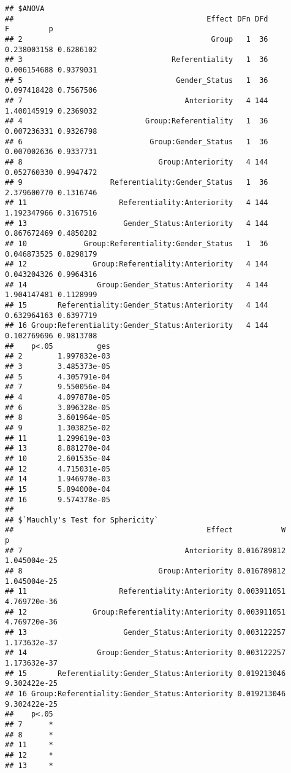 \documentclass[
]{article}
\begin{document}
\begin{verbatim}
## $ANOVA
##                                            Effect DFn DFd           F         p
## 2                                           Group   1  36 0.238003158 0.6286102
## 3                                  Referentiality   1  36 0.006154688 0.9379031
## 5                                   Gender_Status   1  36 0.097418428 0.7567506
## 7                                     Anteriority   4 144 1.400145919 0.2369032
## 4                            Group:Referentiality   1  36 0.007236331 0.9326798
## 6                             Group:Gender_Status   1  36 0.007002636 0.9337731
## 8                               Group:Anteriority   4 144 0.052760330 0.9947472
## 9                    Referentiality:Gender_Status   1  36 2.379600770 0.1316746
## 11                     Referentiality:Anteriority   4 144 1.192347966 0.3167516
## 13                      Gender_Status:Anteriority   4 144 0.867672469 0.4850282
## 10             Group:Referentiality:Gender_Status   1  36 0.046873525 0.8298179
## 12               Group:Referentiality:Anteriority   4 144 0.043204326 0.9964316
## 14                Group:Gender_Status:Anteriority   4 144 1.904147481 0.1128999
## 15       Referentiality:Gender_Status:Anteriority   4 144 0.632964163 0.6397719
## 16 Group:Referentiality:Gender_Status:Anteriority   4 144 0.102769696 0.9813708
##    p<.05          ges
## 2        1.997832e-03
## 3        3.485373e-05
## 5        4.305791e-04
## 7        9.550056e-04
## 4        4.097878e-05
## 6        3.096328e-05
## 8        3.601964e-05
## 9        1.303825e-02
## 11       1.299619e-03
## 13       8.881270e-04
## 10       2.601535e-04
## 12       4.715031e-05
## 14       1.946970e-03
## 15       5.894000e-04
## 16       9.574378e-05
## 
## $`Mauchly's Test for Sphericity`
##                                            Effect           W            p
## 7                                     Anteriority 0.016789812 1.045004e-25
## 8                               Group:Anteriority 0.016789812 1.045004e-25
## 11                     Referentiality:Anteriority 0.003911051 4.769720e-36
## 12               Group:Referentiality:Anteriority 0.003911051 4.769720e-36
## 13                      Gender_Status:Anteriority 0.003122257 1.173632e-37
## 14                Group:Gender_Status:Anteriority 0.003122257 1.173632e-37
## 15       Referentiality:Gender_Status:Anteriority 0.019213046 9.302422e-25
## 16 Group:Referentiality:Gender_Status:Anteriority 0.019213046 9.302422e-25
##    p<.05
## 7      *
## 8      *
## 11     *
## 12     *
## 13     *

\end{verbatim}
\end{document}
